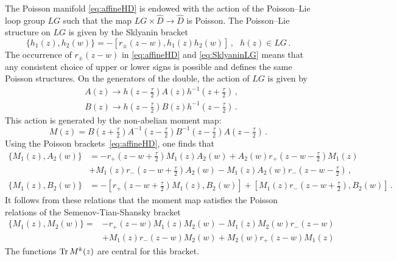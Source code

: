 The Poisson manifold \eqref{eq:affineHD} is endowed with the action of the Poisson--Lie loop group $LG$ such that the map $LG\times \widehat{D}\to \widehat{D}$ is Poisson. The Poisson--Lie structure on $LG$
is given by the Sklyanin bracket
\begin{equation}
\label{eq:SklyaninLG}
\{h_1(z),h_2(w)\}= - [r_{\pm}(z-w),h_1(z)h_2(w)]\, , ~~~h(z)\in LG\, .
\end{equation}
The occurrence  of $r_{\pm}(z-w)$ in \eqref{eq:affineHD} and \eqref{eq:SklyaninLG} means that any consistent choice of upper or lower signs is possible and defines the same Poisson structures.
On the generators of the double, the action of $LG$ is given by 
\begin{equation}
\label{eq:group_action}
\begin{split}
&A(z) \to h(z - \tfrac{\tau}{2}) A(z) h^{-1}(z + \tfrac{\tau}{2})\,,\\
&B(z) \to h(z - \tfrac{\tau}{2}) B(z) h^{-1}(z - \tfrac{\tau}{2})\,.
\end{split}
\end{equation}
This action is generated by the non-abelian moment map:
\begin{equation}
\label{eq:mom_map_HD}
M(z)=B(z+\tfrac{\tau}{2})A^{-1}(z-\tfrac{\tau}{2})B^{-1}(z-\tfrac{\tau}{2})A(z-\tfrac{\tau}{2})\, .
\end{equation}
Using the Poisson brackets~\eqref{eq:affineHD}, one finds that
\begin{equation}
\label{eq:Pois_Mx_My_to_be_checked}
\begin{split}
\{ M_1(z), A_2(w)\} &= - r_+(z-w+ \tfrac{\tau}{2}) M_1(z) A_2(w) + A_2(w)  r_+(z-w-\tfrac{\tau}{2}) M_1(z) \\
&+M_1(z) r_-(z-w +\tfrac{\tau}{2})  A_2(w) - M_1(z) A_2(w)r_-(z-w -\tfrac{\tau}{2}) \,,\\
\{ M_1(z), B_2(w)\} &= -[ r_+(z-w+ \tfrac{\tau}{2})M_1(z), B_2(w) ] + [ M_1(z) r_-(z-w +\tfrac{\tau}{2}) , B_2(w) ]\,.
\end{split}
\end{equation}
It follows from these relations that the moment map satisfies the Poisson relations of the Semenov-Tian-Shansky bracket 
\begin{equation}
\label{eq:STSbracket}
\begin{aligned}
\{ M_1(z), M_2(w) \}=&- r_+(z-w) M_1(z) M_2 (w)  - M_1(z)  M_2 (w) r_-(z-w) \\
&+ M_1(z) r_-(z-w) M_2 (w)+ M_2 (w) r_+(z-w) M_1(z)  
\end{aligned}
\end{equation}
The functions $\operatorname{Tr} M^k(z)$ are central for this bracket.

